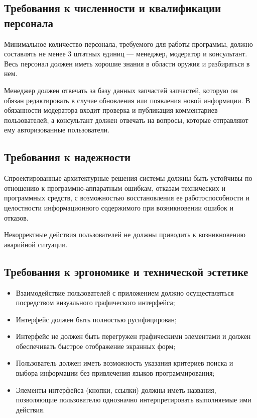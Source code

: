 \documentclass[14pt]{extreport}
\begin{document}
\subsection{Требования к численности и квалификации персонала}
Минимальное количество персонала, требуемого для работы программы, должно
составлять не менее 3 штатных единиц — менеджер, модератор и консультант. Весь персонал должен иметь хорошие знания в области оружия и разбираться в нем.

Менеджер должен отвечать за базу данных запчастей запчастей, которую он обязан редактировать в случае обновления или появления новой информации.  В обязанности модератора входит проверка и публикация комментариев пользователей, а консультант должен отвечать на вопросы, которые отправляют ему авторизованные пользователи.

\subsection{Требования к надежности}
Спроектированные архитектурные решения системы должны быть устойчивы по отношению к программно-аппаратным ошибкам, отказам технических и программных средств, с возможностью восстановления ее работоспособности и целостности информационного содержимого при возникновении ошибок и отказов.

Некорректные действия пользователей не должны приводить к возникновению аварийной ситуации.

\subsection{Требования к эргономике и технической эстетике}
\begin{itemize}
	\item Взаимодействие пользователей с приложением должно осуществляться посредством визуального графического интерфейса;
	\item Интерфейс должен быть полностью русифицирован;
	\item Интерфейс не должен быть перегружен графическими элементами и должен обеспечивать быстрое отображение экранных форм;
	\item Пользователь должен иметь возможность указания критериев поиска и выбора информации без привлечения языков программирования;
	\item Элементы интерфейса (кнопки, ссылки) должны иметь названия, позволяющие пользователю однозначно интерпретировать выполняемые 
ими действия.
\end{itemize}
\end{document}
